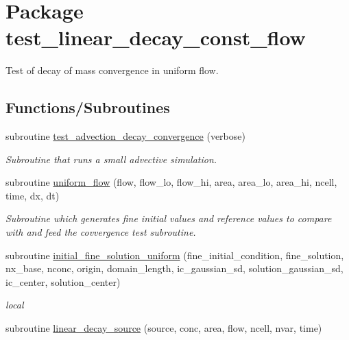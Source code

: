 \hypertarget{a00088}{
\section{Package test\_\-linear\_\-decay\_\-const\_\-flow}
\label{a00088}
}
Test of decay of mass convergence in uniform flow.  


\subsection*{Functions/Subroutines}
\begin{CompactItemize}
\item 
\hypertarget{a00088_43ea736146fad72ed2809da270eca9df}{
subroutine \hyperlink{a00088_43ea736146fad72ed2809da270eca9df}{test\_\-advection\_\-decay\_\-convergence} (verbose)}
\label{a00088_43ea736146fad72ed2809da270eca9df}

\begin{CompactList}\small\item\em Subroutine that runs a small advective simulation. \item\end{CompactList}\item 
subroutine \hyperlink{a00088_062d78f13f8d4309047d345fa3c59f8d}{uniform\_\-flow} (flow, flow\_\-lo, flow\_\-hi, area, area\_\-lo, area\_\-hi, ncell, time, dx, dt)
\begin{CompactList}\small\item\em Subroutine which generates fine initial values and reference values to compare with and feed the covvergence test subroutine. \item\end{CompactList}\item 
subroutine \hyperlink{a00088_9525b389ed0fa43aa51ef05fa6c03526}{initial\_\-fine\_\-solution\_\-uniform} (fine\_\-initial\_\-condition, fine\_\-solution, nx\_\-base, nconc, origin, domain\_\-length, ic\_\-gaussian\_\-sd, solution\_\-gaussian\_\-sd, ic\_\-center, solution\_\-center)
\begin{CompactList}\small\item\em local \item\end{CompactList}\item 
subroutine \hyperlink{a00088_cd44223079c62cf775325127c909c86e}{linear\_\-decay\_\-source} (source, conc, area, flow, ncell, nvar, time)
\end{CompactItemize}
